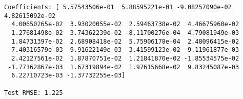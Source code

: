 \begin{tcolorbox}[breakable, size=fbox, boxrule=1pt, pad at break*=1mm,colback=cellbackground, colframe=cellborder]
\begin{Verbatim}[commandchars=\\\{\}]
Coefficients: [ 5.57543506e-01  5.88595221e-01 -9.08257090e-02  4.82615092e-02
  4.00650265e-02  3.93020055e-02  2.59463738e-02  4.46675960e-02
  1.27681498e-02  3.74362239e-02 -8.11700276e-04  4.79081949e-03
  1.84731397e-02  2.68908418e-02  5.75906178e-04  2.48096415e-02
  7.40316579e-03  9.91622149e-03  3.41599123e-02 -9.11961877e-03
  2.42127561e-02  1.87870751e-02  1.21841870e-02 -1.85534575e-02
 -1.77162867e-03  1.67319894e-02  1.97615668e-02  9.83245087e-03
  6.22710723e-03 -1.37732255e-03]

Test RMSE: 1.225
\end{Verbatim}
\end{tcolorbox}

\begin{center}
\end{center}
    
%
%
%
%
%
%
%

